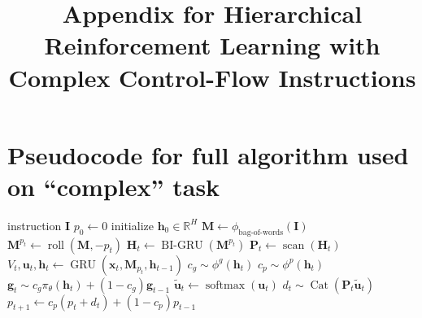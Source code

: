 \documentclass{article}
\title{Appendix for Hierarchical Reinforcement Learning with Complex Control-Flow
Instructions}
\DeclareMathOperator{\GRU}{GRU}
\DeclareMathOperator{\BIGRU}{BI-GRU}
\DeclareMathOperator{\Cat}{Cat}
\DeclareMathOperator{\roll}{roll}
\DeclareMathOperator{\scan}{scan}
\DeclareMathOperator{\softmax}{softmax}
\begin{document}
\date{}
\author{}
\maketitle
\section{Pseudocode for full algorithm used on ``complex'' task}
\label{full-algorithm}

\begin{algorithm}[h]
\label{subtask-update}
  \begin{algorithmic}[1]
     instruction $\mathbf{I}$
    \STATE $p_0 \gets 0$
    \STATE initialize $\mathbf{h}_0 \in \mathbb{R}^H$
    \STATE $\mathbf{M} \gets \phi_{\text{bag-of-words}}(\mathbf{I})$
    \STATE $\mathbf{M}^{p_t} \gets \roll\left(\mathbf{M}, -p_t\right)$
    \STATE ${\mathbf{H}_t} \gets \BIGRU\left(\mathbf{M}^{p_t}\right)$
    \STATE ${\mathbf{P}_t \gets \scan\left(\mathbf{H}_t\right)}$
    \STATE $V_t, \mathbf{u}_t, \mathbf{h}_t  \gets \GRU\left(\mathbf{x}_t, \mathbf{M}_{p_t}, \mathbf{h}_{t-1}\right)$
    \STATE $c_g \sim \phi^g\left(\mathbf{h}_t\right)$
    \STATE $c_p \sim \phi^p\left(\mathbf{h}_t\right)$
    \STATE $\mathbf{g}_{t} \sim c_g \pi_\theta\left(\mathbf{h}_t\right) + (1- c_g)\mathbf{g}_{t-1}$
    \STATE $\tilde{\mathbf{u}}_{t} \gets \softmax\left(\mathbf{u}_t\right)$
    \STATE $d_{t} \sim \Cat\left(\mathbf{P}_t\tilde{\mathbf{u}}_t\right)$ 
    \STATE $p_{t + 1} \gets c_p\left(p_t + d_t\right) + (1-c_p)p_{t-1}$
    \ENDFOR
  \end{algorithmic}
\end{algorithm}
\end{document}
